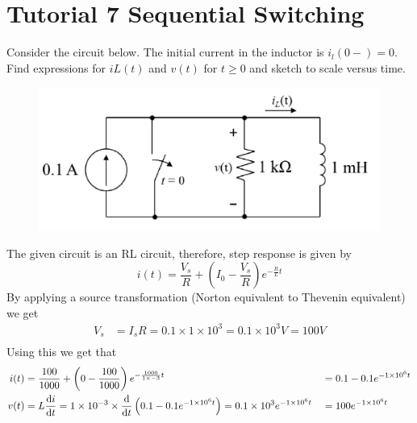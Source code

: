 \section{Tutorial 7 \- Sequential Switching}
Consider the circuit below. The initial current in the inductor is $i_l(0-) = 0$. Find expressions for
$iL(t)$ and $v(t)$ for $t \geq 0$ and sketch to scale versus time.
\begin{figure}[H]
    \centering
    \includegraphics[width=0.4\linewidth]{tutorials/figures/seq_switch_practice.png}
\end{figure}
The given circuit is an RL circuit, therefore, step response is given by
\begin{equation*}
    i(t) = \frac{V_s}{R} + \left(I_0 - \frac{V_s}{R}\right)e^{-\frac{R}{L}t}
\end{equation*}
By applying a source transformation (Norton equivalent to Thevenin equivalent) we get
\begin{align*}
    V_s &= I_s R = 0.1 \times 1 \times 10^3 = 0.1 \times 10^3 V = 100V\\
\end{align*}
Using this we get that
\begin{align*}
    i(t) &= \frac{100}{1000} + \left(0 - \frac{100}{1000}\right)e^{-\frac{1000}{1\times{-3}}t} &&= 0.1 - 0.1e^{-1\times10^6 t} \\
    v(t) &= L \odv{i}{t} = 1\times10^{-3} \times \odv{}{t} \left(0.1 - 0.1e^{-1\times10^6 t}\right) = 0.1\times10^3 e^{-1\times10^6 t} &&= 100e^{-1\times10^6 t}
\end{align*}
